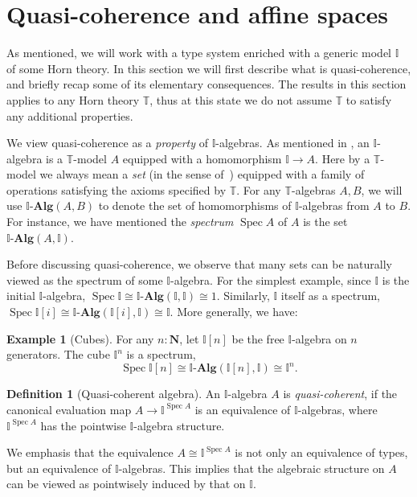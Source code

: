 \documentclass[12pt]{amsart}
\theoremstyle{definition}
\newtheorem{example}[theorem]{Example}
\newtheorem{definition}[theorem]{Definition}
\newcommand{\mb}[1]{\mathbf{#1}}
\newcommand{\mbb}[1]{\mathbb{#1}}
\newcommand{\T}{\mbb T}
\newcommand{\I}{\mbb I}
\newcommand{\alg}{\text{-}\mb{Alg}}
\newcommand{\N}{\mb N}
\newcommand{\spec}{\operatorname{Spec}}
\begin{document}
\section{Quasi-coherence and affine spaces}\label{sec:basics}

As mentioned, we will work with a type system enriched with a generic model $\I$ of some Horn theory. In this section we will first describe what is quasi-coherence, and briefly recap some of its elementary consequences. The results in this section applies to any Horn theory $\T$, thus at this state we do not assume $\T$ to satisfy any additional properties.

We view quasi-coherence as a \emph{property} of $\I$-algebras. As mentioned in , an $\I$-algebra is a $\T$-model $A$ equipped with a homomorphism $\I \to A$. Here by a $\T$-model we always mean a \emph{set} (in the sense of~\cite{hottbook}) equipped with a family of operations satisfying the axioms specified by $\T$. For any $\T$-algebras $A,B$, we will use $\I\alg(A,B)$ to denote the set of homomorphisms of $\I$-algebras from $A$ to $B$. For instance, we have mentioned the \emph{spectrum} $\spec A$ of $A$ is the set $\I\alg(A,\I)$.

Before discussing quasi-coherence, we observe that many sets can be naturally viewed as the spectrum of some $\I$-algebra. For the simplest example, since $\I$ is the initial $\I$-algebra, $\spec \I \cong \I\alg(\I,\I) \cong 1$. Similarly, $\I$ itself as a spectrum, $\spec \I[i] \cong \I\alg(\I[i],\I) \cong \I$. More generally, we have:

\begin{example}[Cubes]\label{exm:cubeaffine}
  For any $n:\N$, let $\I[n]$ be the free $\I$-algebra on $n$ generators. The cube $\I^n$ is a spectrum,
  \[ \spec \I[n] \cong \I\alg(\I[n],\I) \cong \I^n. \]
\end{example}

\begin{definition}[Quasi-coherent algebra]
  An $\I$-algebra $A$ is \emph{quasi-coherent}, if the canonical evaluation map $A \to \I^{\spec A}$ is an equivalence of $\I$-algebras, where $\I^{\spec A}$ has the pointwise $\I$-algebra structure.
\end{definition}

We emphasis that the equivalence $A \cong \I^{\spec A}$ is not only an equivalence of types, but an equivalence of $\I$-algebras. This implies that the algebraic structure on $A$ can be viewed as pointwisely induced by that on $\I$. 
\end{document}
